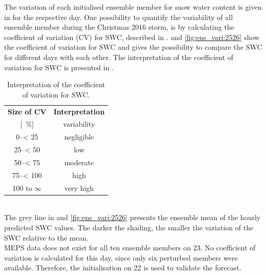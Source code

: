 % 
\par\medskip\noindent
The variation of each initialised ensemble member for snow water content is given in  for the respective day. %
One possibility to quantify the variability of all ensemble member during the Christmas 2016 storm, is by calculating the coefficient of variation (CV) for SWC, described in . 
 and \ref{fig:ens_vari:2526} show the coefficient of variation for SWC and gives the possibility to compare the SWC for different days with each other. The interpretation of the coefficient of variation for SWC is presented in .
\begin{table}[t!]
	\begin{center}
		\caption{Interpretation of the coefficient of variation for SWC.} \label{tab:verification}
		\begin{tabular}{lc|c}
			\hline\hline
			\multicolumn{2}{c|}{\textbf{Size of CV}} & {\textbf{Interpretation}} \\ 
			\multicolumn{2}{c|}{[\SI{}{\percent}]} & variability \\ \hline \hline 
			\multicolumn{2}{c|}{\numrange{0}{< 25}} & negligible  \\ \hline
			\multicolumn{2}{c|}{\numrange{25}{< 50}} & low \\ \hline
			\multicolumn{2}{c|}{\numrange{50}{< 75}} & moderate \\ \hline
			\multicolumn{2}{c|}{\numrange{75}{< 100}} & high \\ \hline
			\multicolumn{2}{c|}{\num{100} to $\infty$} & very high  \\ \hline \hline
		\end{tabular}
	\end{center}
\end{table}
\noindent
\\
The grey line in  and \ref{fig:ens_vari:2526} presents the ensemble mean of the hourly predicted SWC values. The darker the shading, the smaller the variation of the SWC relative to the mean. 
\\
MEPS data does not exist for all ten ensemble members on \SI{23}{\dec}. No coefficient of variation is calculated for this day, since only six perturbed members were available. Therefore, the initialisation on \SI{22}{\dec} is used to validate the forecast. 
